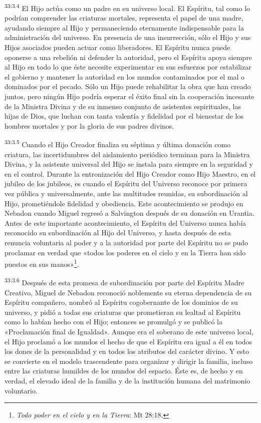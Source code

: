 \par
\textsuperscript{33:3.4} El Hijo actúa como un padre en su universo local. El Espíritu, tal como lo podrían comprender las criaturas mortales, representa el papel de una madre, ayudando siempre al Hijo y permaneciendo eternamente indispensable para la administración del universo. En presencia de una insurrección, sólo el Hijo y sus Hijos asociados pueden actuar como liberadores. El Espíritu nunca puede oponerse a una rebelión ni defender la autoridad, pero el Espíritu apoya siempre al Hijo en todo lo que éste necesite experimentar en sus esfuerzos por estabilizar el gobierno y mantener la autoridad en los mundos contaminados por el mal o dominados por el pecado. Sólo un Hijo puede rehabilitar la obra que han creado juntos, pero ningún Hijo podría esperar el éxito final sin la cooperación incesante de la Ministra Divina y de su inmenso conjunto de asistentes espirituales, las hijas de Dios, que luchan con tanta valentía y fidelidad por el bienestar de los hombres mortales y por la gloria de sus padres divinos.

\par
\textsuperscript{33:3.5} Cuando el Hijo Creador finaliza su séptima y última donación como criatura, las incertidumbres del aislamiento periódico terminan para la Ministra Divina, y la asistente universal del Hijo se instala para siempre en la seguridad y en el control. Durante la entronización del Hijo Creador como Hijo Maestro, en el jubileo de los jubileos, es cuando el Espíritu del Universo reconoce por primera vez pública y universalmente, ante las multitudes reunidas, su subordinación al Hijo, prometiéndole fidelidad y obediencia. Este acontecimiento se produjo en Nebadon cuando Miguel regresó a Salvington después de su donación en Urantia. Antes de este importante acontecimiento, el Espíritu del Universo nunca había reconocido su subordinación al Hijo del Universo, y hasta después de esta renuncia voluntaria al poder y a la autoridad por parte del Espíritu no se pudo proclamar en verdad que «todos los poderes en el cielo y en la Tierra han sido puestos en sus manos»\footnote{\textit{Todo poder en el cielo y en la Tierra}: Mt 28:18.}.

\par
\textsuperscript{33:3.6} Después de esta promesa de subordinación por parte del Espíritu Madre Creativo, Miguel de Nebadon reconoció noblemente su eterna dependencia de su Espíritu compañero, nombró al Espíritu cogobernante de los dominios de su universo, y pidió a todas sus criaturas que prometieran su lealtad al Espíritu como lo habían hecho con el Hijo; entonces se promulgó y se publicó la «Proclamación final de Igualdad». Aunque era el soberano de este universo local, el Hijo proclamó a los mundos el hecho de que el Espíritu era igual a él en todos los dones de la personalidad y en todos los atributos del carácter divino. Y esto se convierte en el modelo trascendente para organizar y dirigir la familia, incluso entre las criaturas humildes de los mundos del espacio. Éste es, de hecho y en verdad, el elevado ideal de la familia y de la institución humana del matrimonio voluntario.

